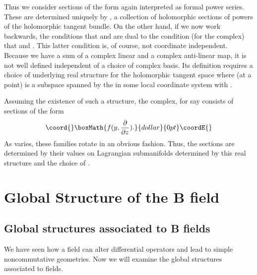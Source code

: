 \documentclass[a4paper,11pt]{amsart}
\begin{document}
Thus we consider sections of the form 
\coordHE{} 
again interpreted as formal power series.
These are determined uniquely by \coordHE{}, 
a collection of holomorphic sections of powers of the holomorphic tangent
 bundle. On the other hand, if we now work backwards, the conditions that 
\coordHE{} and
 \coordHE{} are \coordHE{} 
dual to the condition (for the \coordHE{} complex) that 
\coordHE{} and 
\coordHE{}. 
This latter condition is, of course, not coordinate independent. Because we 
have a sum of a complex linear and a complex anti-linear map, it is not well
 defined independent of a choice of complex basis. Its definition requires a 
 choice of underlying real structure for the
holomorphic tangent space \coordHE{} where (at a point)
\coordHE{} is a subspace spanned by the \coordHE{}
 in some local coordinate system with \coordHE{}. 
 
Assuming the existence of such a structure, the \coordHE{} complex, for say \coordHE{}
consists of  sections of the form 
$$\coord{}\boxMath{f(y,\frac{\partial}{\partial z}).}{dollar}{0pt}\coordE{}$$ 
As \coordHE{} varies, these families rotate in an obvious fashion.
Thus, the sections are determined by their values on Lagrangian submanifolds
determined by this real structure and the choice of \coordHE{}. 
 
\section{Global Structure of the B field}\label{geomB}
\subsection{Global structures associated to B fields}
We have seen how a \coordHE{} field can alter differential operators and lead to simple 
noncommutative geometries. Now we will examine the global structures associated
to \coordHE{} fields. 
\end{document}
